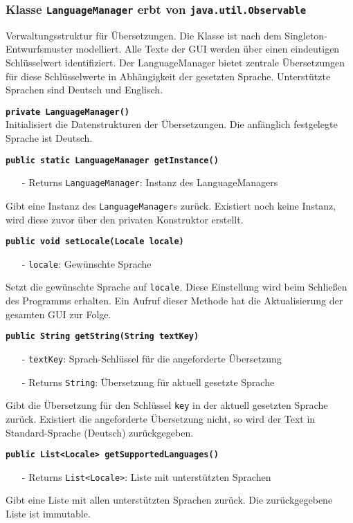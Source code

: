 \documentclass[parskip=full,11pt,twoside]{scrartcl}
\begin{document}
\subsubsection{Klasse \texttt{LanguageManager} erbt von \texttt{java.util.Observable}}

Verwaltungsstruktur für Übersetzungen. Die Klasse ist nach dem Singleton-Entwurfsmuster modelliert. Alle Texte der GUI werden über einen eindeutigen Schlüsselwert identifiziert. Der LanguageManager bietet zentrale Übersetzungen für diese Schlüsselwerte in Abhängigkeit der gesetzten Sprache. Unterstützte Sprachen sind Deutsch und Englisch.

\textbf{\texttt{private LanguageManager()}}\\
Initialisiert die Datenstrukturen der Übersetzungen. Die anfänglich festgelegte Sprache ist Deutsch.

\textbf{\texttt{public static LanguageManager getInstance()}}
\begin{itemize}[noitemsep]
	\item[-] Returns \texttt{LanguageManager}: Instanz des LanguageManagers
\end{itemize}
Gibt eine Instanz des \texttt{LanguageManager}s zurück. Existiert noch keine Instanz, wird diese zuvor über den privaten Konstruktor erstellt.

\textbf{\texttt{public void setLocale(Locale locale)}}
\begin{itemize}[noitemsep]
	\item[-] \texttt{locale}: Gewünschte Sprache
\end{itemize}
Setzt die gewünschte Sprache auf \texttt{locale}. Diese Einstellung wird beim Schließen des Programms erhalten. Ein Aufruf dieser Methode hat die Aktualisierung der gesamten GUI zur Folge.

\textbf{\texttt{public String getString(String textKey)}}
\begin{itemize}[noitemsep]
	\item[-] \texttt{textKey}: Sprach-Schlüssel für die angeforderte Übersetzung
	\item[-] Returns \texttt{String}: Übersetzung für aktuell gesetzte Sprache
\end{itemize}
Gibt die Übersetzung für den Schlüssel \texttt{key} in der aktuell gesetzten Sprache zurück. Existiert die angeforderte Übersetzung nicht, so wird der Text in Standard-Sprache (Deutsch) zurückgegeben.

\textbf{\texttt{public List<Locale> getSupportedLanguages()}}
\begin{itemize}[noitemsep]
    \item[-] Returns \texttt{List<Locale>}: Liste mit unterstützten Sprachen
\end{itemize}
Gibt eine Liste mit allen unterstützten Sprachen zurück. Die zurückgegebene Liste ist immutable.
\end{document}
